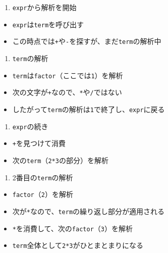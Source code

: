\begin{enumerate}
\def\labelenumi{\arabic{enumi}.}
\tightlist
\item
  \texttt{expr}から解析を開始
\end{enumerate}

\begin{itemize}
\tightlist
\item
  \texttt{expr}は\texttt{term}を呼び出す
\item
  この時点では\texttt{+}や\texttt{-}を探すが、まだ\texttt{term}の解析中
\end{itemize}

\begin{enumerate}
\def\labelenumi{\arabic{enumi}.}
\setcounter{enumi}{1}
\tightlist
\item
  \texttt{term}の解析
\end{enumerate}

\begin{itemize}
\tightlist
\item
  \texttt{term}は\texttt{factor}（ここでは\texttt{1}）を解析
\item
  次の文字が\texttt{+}なので、\texttt{*}や\texttt{/}ではない
\item
  したがって\texttt{term}の解析は\texttt{1}で終了し、\texttt{expr}に戻る
\end{itemize}

\begin{enumerate}
\def\labelenumi{\arabic{enumi}.}
\setcounter{enumi}{2}
\tightlist
\item
  \texttt{expr}の続き
\end{enumerate}

\begin{itemize}
\tightlist
\item
  \texttt{+}を見つけて消費
\item
  次の\texttt{term}（\texttt{2*3}の部分）を解析
\end{itemize}

\begin{enumerate}
\def\labelenumi{\arabic{enumi}.}
\setcounter{enumi}{3}
\tightlist
\item
  2番目の\texttt{term}の解析
\end{enumerate}

\begin{itemize}
\tightlist
\item
  \texttt{factor}（\texttt{2}）を解析
\item
  次が\texttt{*}なので、\texttt{term}の繰り返し部分が適用される
\item
  \texttt{*}を消費して、次の\texttt{factor}（\texttt{3}）を解析
\item
  \texttt{term}全体として\texttt{2*3}がひとまとまりになる
\end{itemize}


